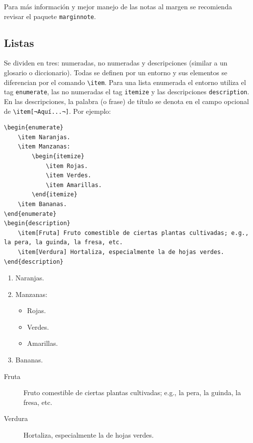 Para más información y mejor manejo de las notas al margen se recomienda revisar el paquete \texttt{marginnote}.

\subsection{Listas}
Se dividen en tres: numeradas, no numeradas y descripciones (similar a un glosario o diccionario).
Todas se definen por un entorno y sus elementos se diferencian por el comando \lstinline|\item|.
Para una lista enumerada el entorno utiliza el tag \texttt{enumerate}, las no numeradas el tag \texttt{itemize} y las descripciones \texttt{description}.
En las descripciones, la palabra (o frase) de título se denota en el campo opcional de \lstinline|\item[¬Aquí...¬]|. Por ejemplo:
\begin{lstlisting}[basicstyle=\footnotesize\ttfamily]
\begin{enumerate}
	\item Naranjas.
	\item Manzanas:
		\begin{itemize}
			\item Rojas.
			\item Verdes.
			\item Amarillas.
		\end{itemize}
	\item Bananas.
\end{enumerate}
\begin{description}
	\item[Fruta] Fruto comestible de ciertas plantas cultivadas; e.g., la pera, la guinda, la fresa, etc.
	\item[Verdura] Hortaliza, especialmente la de hojas verdes.
\end{description}
\end{lstlisting}
\begin{enumerate}
	\item Naranjas.
	\item Manzanas:
		\begin{itemize}
			\item Rojas.
			\item Verdes.
			\item Amarillas.
		\end{itemize}
	\item Bananas.
\end{enumerate}
\begin{description}
	\item[Fruta] Fruto comestible de ciertas plantas cultivadas; e.g., la pera, la guinda, la fresa, etc.
	\item[Verdura] Hortaliza, especialmente la de hojas verdes.
\end{description}

